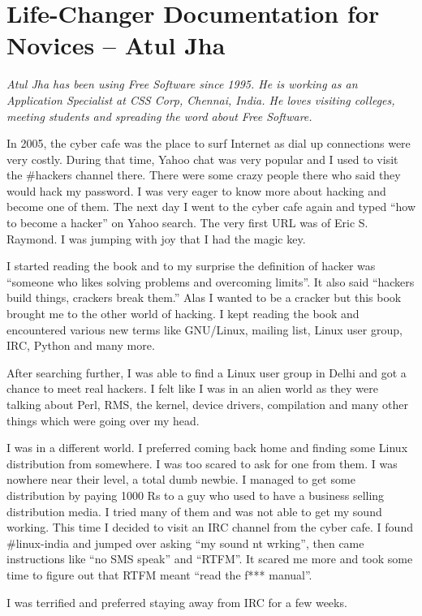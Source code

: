 \chapter{Life-Changer Documentation for Novices -- Atul Jha}

\textit{Atul Jha has been using Free Software since 1995. He is working as an
Application Specialist at CSS Corp, Chennai, India. He loves visiting colleges,
meeting students and spreading the word about Free Software.}

In 2005, the cyber cafe was the place to surf Internet as dial up connections
were very costly. During that time, Yahoo chat was very popular and I used to
visit the \#hackers channel there. There were some crazy people there who said they
would hack my password. I was very eager to know more about hacking and become
one of them. The next day I went to the cyber cafe again and typed ``how to become a
hacker'' on Yahoo search. The very first URL was of Eric S. Raymond. I was jumping
with joy that I had the magic key.
 
I started reading the book and to my surprise the definition of hacker was
``someone who likes solving problems and overcoming limits''. It also said
``hackers build things, crackers break them.'' Alas I wanted to be a cracker but
this book brought me to the other world of hacking. I kept reading the book and
encountered various new terms like GNU/Linux, mailing list, Linux user group,
IRC, Python and many more. 

After searching further, I was able to find a Linux user group in
Delhi and got a chance to meet real hackers. I felt like I was in an
alien world as they were talking about Perl, RMS, the kernel, device
drivers, compilation and many other things which were going over my
head.

I was in a different world. I preferred coming back home and finding some
Linux distribution from somewhere. I was too scared to ask for one
from them. I was nowhere near their level, a total dumb newbie. I managed to get some
distribution by paying 1000 Rs to a guy who used to have a business
selling distribution media. I tried many of them and was not able to
get my sound working. This time I decided to visit an IRC channel from
the cyber cafe. I found \#linux-india and jumped over asking ``my sound
nt wrking'', then came instructions like ``no SMS speak'' and ``RTFM''. It
scared me more and took some time to figure out that RTFM meant ``read the
f*** manual''.

I was terrified and preferred staying away from IRC for a few weeks.

